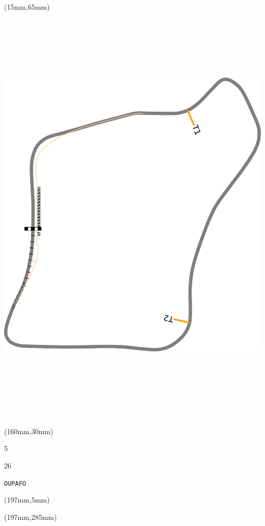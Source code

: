 \begin{textblock*}{185mm}(15mm,65mm)%
\centering
\mbox{\includegraphics[width=185mm,height=210mm,keepaspectratio]{PT/OUPAFO.pdf}}
\end{textblock*}
\begin{textblock*}{40mm}(160mm,30mm)%
\Large
\par{} 
\par5 
\par26 
\par\hfill\tiny\tt OUPAFO\\
\end{textblock*}
\begin{textblock*}{20mm}(197mm,5mm)%
\fbox{\thepage}
\label{OUPAFO}
\end{textblock*}
\begin{textblock*}{20mm}(197mm,285mm)%
\fbox{\thepage}
\end{textblock*}

